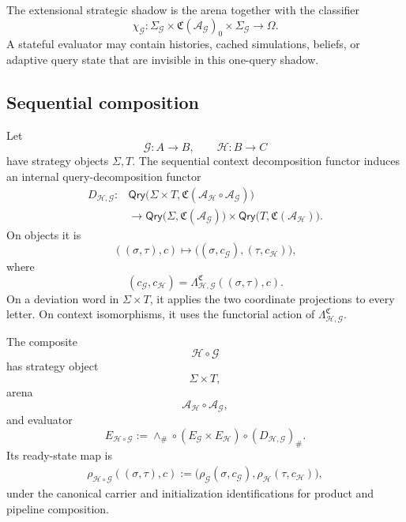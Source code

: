 The extensional strategic shadow is the arena together with the classifier
\[
  \chi_{\mathcal G}:
  \Sigma_{\mathcal G}
  \times
  \mathfrak C(\mathcal A_{\mathcal G})_0
  \times
  \Sigma_{\mathcal G}
  \longrightarrow
  \Omega.
\]
A stateful evaluator may contain histories, cached simulations, beliefs, or adaptive query state
that are invisible in this one-query shadow.

\subsection{Sequential composition}

Let
\[
  \mathcal G:A\to B,
  \qquad
  \mathcal H:B\to C
\]
have strategy objects \(\Sigma,T\). The sequential context decomposition functor induces an internal
query-decomposition functor
\[
\begin{aligned}
  D_{\mathcal H,\mathcal G}:&
  \mathsf{Qry}
  \bigl(
    \Sigma\times T,
    \mathfrak C(
      \mathcal A_{\mathcal H}\circ\mathcal A_{\mathcal G}
    )
  \bigr)
  \\
  &\longrightarrow
  \mathsf{Qry}
  \bigl(
    \Sigma,
    \mathfrak C(\mathcal A_{\mathcal G})
  \bigr)
  \times
  \mathsf{Qry}
  \bigl(
    T,
    \mathfrak C(\mathcal A_{\mathcal H})
  \bigr).
\end{aligned}
\]
On objects it is
\[
  ((\sigma,\tau),c)
  \longmapsto
  \bigl(
    (\sigma,c_{\mathcal G}),
    (\tau,c_{\mathcal H})
  \bigr),
\]
where
\[
  (c_{\mathcal G},c_{\mathcal H})
  =
  \Lambda^{\mathfrak C}_{\mathcal H,\mathcal G}
  ((\sigma,\tau),c).
\]
On a deviation word in \(\Sigma\times T\), it applies the two coordinate projections to every
letter. On context isomorphisms, it uses the functorial action of
\(\Lambda^{\mathfrak C}_{\mathcal H,\mathcal G}\).

\begin{definition}
\label{def:strategic-sequential-composite}
The composite
\[
  \mathcal H\circ\mathcal G
\]
has strategy object
\[
  \Sigma\times T,
\]
arena
\[
  \mathcal A_{\mathcal H}\circ\mathcal A_{\mathcal G},
\]
and evaluator
\[
  E_{\mathcal H\circ\mathcal G}
  :=
  \wedge_\#
  \circ
  (E_{\mathcal G}\times E_{\mathcal H})
  \circ
  (D_{\mathcal H,\mathcal G})_\#.
\]
Its ready-state map is
\[
\begin{aligned}
  \rho_{\mathcal H\circ\mathcal G}
  ((\sigma,\tau),c)
  :=
  \bigl(
    \rho_{\mathcal G}(\sigma,c_{\mathcal G}),
    \rho_{\mathcal H}(\tau,c_{\mathcal H})
  \bigr),
\end{aligned}
\]
under the canonical carrier and initialization identifications for product and pipeline
composition.
\end{definition}

